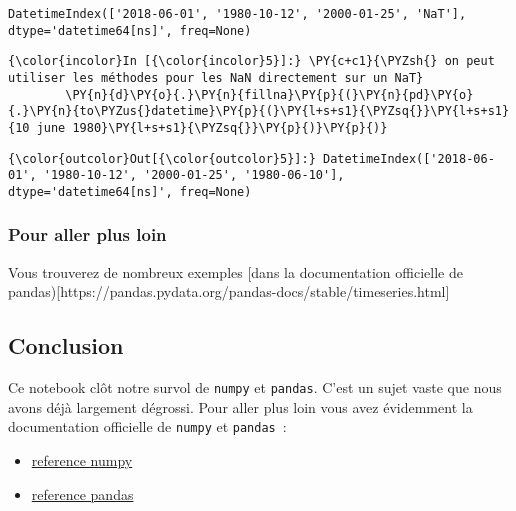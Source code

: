     \begin{Verbatim}[commandchars=\\\{\},frame=single,framerule=0.3mm,rulecolor=\color{cellframecolor}]
DatetimeIndex(['2018-06-01', '1980-10-12', '2000-01-25', 'NaT'], dtype='datetime64[ns]', freq=None)
\end{Verbatim}

    \begin{Verbatim}[commandchars=\\\{\},frame=single,framerule=0.3mm,rulecolor=\color{cellframecolor}]
{\color{incolor}In [{\color{incolor}5}]:} \PY{c+c1}{\PYZsh{} on peut utiliser les méthodes pour les NaN directement sur un NaT}
        \PY{n}{d}\PY{o}{.}\PY{n}{fillna}\PY{p}{(}\PY{n}{pd}\PY{o}{.}\PY{n}{to\PYZus{}datetime}\PY{p}{(}\PY{l+s+s1}{\PYZsq{}}\PY{l+s+s1}{10 june 1980}\PY{l+s+s1}{\PYZsq{}}\PY{p}{)}\PY{p}{)}
\end{Verbatim}


\begin{Verbatim}[commandchars=\\\{\},frame=single,framerule=0.3mm,rulecolor=\color{cellframecolor}]
{\color{outcolor}Out[{\color{outcolor}5}]:} DatetimeIndex(['2018-06-01', '1980-10-12', '2000-01-25', '1980-06-10'], dtype='datetime64[ns]', freq=None)
\end{Verbatim}
            
    \hypertarget{pour-aller-plus-loin}{%
\subsubsection{Pour aller plus loin}\label{pour-aller-plus-loin}}

    Vous trouverez de nombreux exemples {[}dans la documentation officielle
de
pandas){[}https://pandas.pydata.org/pandas-docs/stable/timeseries.html{]}

    \hypertarget{conclusion}{%
\subsection{Conclusion}\label{conclusion}}

    Ce notebook clôt notre survol de \texttt{numpy} et \texttt{pandas}.
C'est un sujet vaste que nous avons déjà largement dégrossi. Pour aller
plus loin vous avez évidemment la documentation officielle de
\texttt{numpy} et \texttt{pandas}~:

\begin{itemize}
\tightlist
\item
  \href{https://docs.scipy.org/doc/numpy-1.13.0/reference/}{reference
  numpy}
\item
  \href{http://pandas.pydata.org/pandas-docs/stable/index.html}{reference
  pandas}
\end{itemize}

